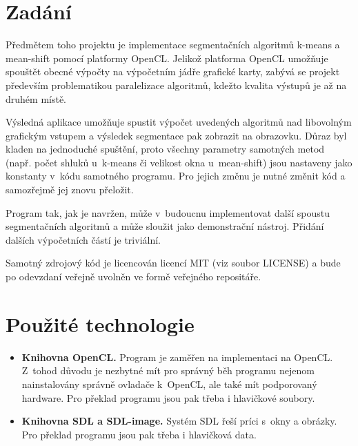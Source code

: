 \documentclass[11pt,a4paper]{article}
\begin{document}
\titlepageandcontents

\section{Zadání}

Předmětem toho projektu je implementace segmentačních algoritmů k-means a mean-shift pomocí platformy OpenCL. Jelikož platforma OpenCL umožňuje spouštět obecné výpočty na výpočetním jádře grafické karty, zabývá se projekt především problematikou paralelizace algoritmů, kdežto kvalita výstupů je až na druhém místě.

Výsledná aplikace umožňuje spustit výpočet uvedených algoritmů nad libovolným grafickým vstupem a výsledek segmentace pak zobrazit na obrazovku. Důraz byl kladen na jednoduché spuštění, proto všechny parametry samotných metod (např. počet shluků u~k-means či velikost okna u~mean-shift) jsou nastaveny jako konstanty v~kódu samotného programu. Pro jejich změnu je nutné změnit kód a samozřejmě jej znovu přeložit.

Program tak, jak je navržen, může v~budoucnu implementovat další spoustu segmentačních algoritmů a může sloužit jako demonstrační nástroj. Přidání dalších výpočetních částí je triviální.

Samotný zdrojový kód je licencován licencí MIT (viz soubor LICENSE) a bude po odevzdaní veřejně uvolněn ve formě veřejného repositáře.

\section{Použité technologie}
\begin{itemize}
  \item \textbf{Knihovna OpenCL.} Program je zaměřen na implementaci na OpenCL. Z~tohod důvodu je nezbytné mít pro správný běh programu nejenom nainstalovány správně ovladače k~OpenCL, ale také mít podporovaný hardware. Pro překlad programu jsou pak třeba i hlavičkové soubory.
  \item \textbf{Knihovna SDL a SDL-image.} Systém SDL řeší príci s~okny a obrázky. Pro překlad programu jsou pak třeba i hlavičková data.
\end{itemize}


\end{document}
